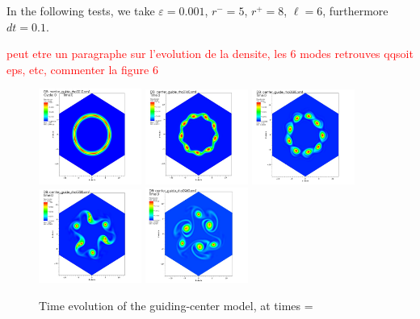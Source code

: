 \documentclass[proc]{edpsmath}
\begin{document}
\noindent In the following tests, we take $\varepsilon=0.001$, $r^-=5$, $r^+=8$, $\ell=6$, furthermore $dt=0.1$.

\textcolor{red}{peut etre un paragraphe sur l'evolution de la densite, les 6 modes retrouves qqsoit eps, etc, commenter la figure 6}
\begin{figure}[h!]
	\includegraphics[width=0.3\textwidth]{figures/gc_spl_1.png}
	\includegraphics[width=0.3\textwidth]{figures/gc_spl_2.png}
	\includegraphics[width=0.3\textwidth]{figures/gc_spl_3.png}
	\includegraphics[width=0.3\textwidth]{figures/gc_spl_4.png}
	\includegraphics[width=0.3\textwidth]{figures/gc_spl_5.png}
	\caption{Time evolution of the guiding-center model, at times = }
\end{figure}
\end{document}
